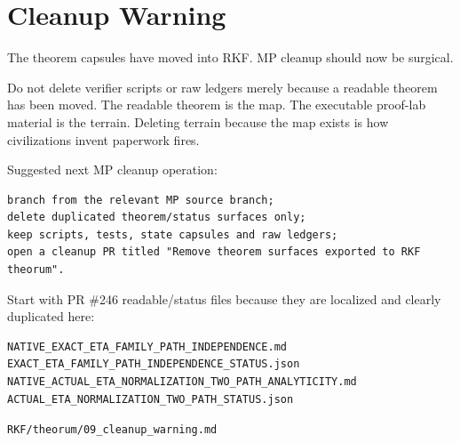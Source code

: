 \hypertarget{cleanup-warning}{%
\chapter{Cleanup Warning}\label{cleanup-warning}}

The theorem capsules have moved into RKF. MP cleanup should now be surgical.

Do not delete verifier scripts or raw ledgers merely because a readable theorem has been moved. The readable theorem is the map. The executable proof-lab material is the terrain. Deleting terrain because the map exists is how civilizations invent paperwork fires.

Suggested next MP cleanup operation:

\begin{verbatim}
branch from the relevant MP source branch;
delete duplicated theorem/status surfaces only;
keep scripts, tests, state capsules and raw ledgers;
open a cleanup PR titled "Remove theorem surfaces exported to RKF theorum".
\end{verbatim}

Start with PR \#246 readable/status files because they are localized and clearly duplicated here:

\begin{verbatim}
NATIVE_EXACT_ETA_FAMILY_PATH_INDEPENDENCE.md
EXACT_ETA_FAMILY_PATH_INDEPENDENCE_STATUS.json
NATIVE_ACTUAL_ETA_NORMALIZATION_TWO_PATH_ANALYTICITY.md
ACTUAL_ETA_NORMALIZATION_TWO_PATH_STATUS.json
\end{verbatim}

\begin{flushright}\small\texttt{RKF/theorum/09\_cleanup\_warning.md}\end{flushright}
